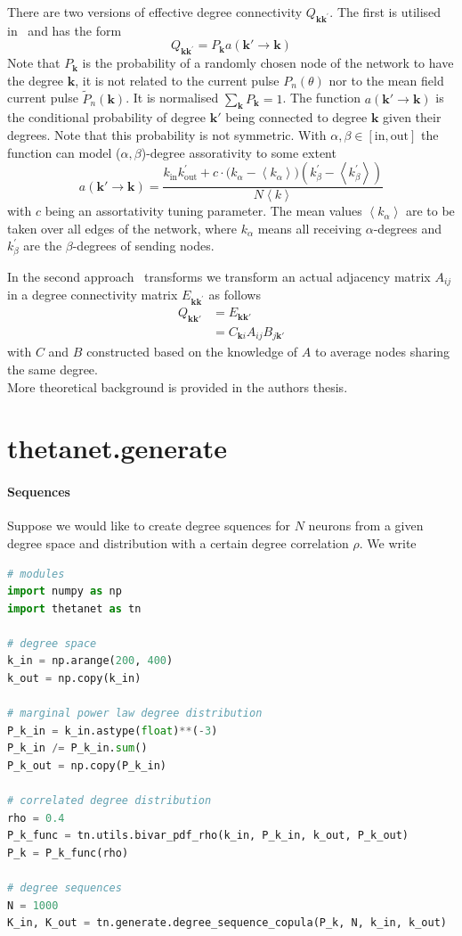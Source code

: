 \documentclass[bibliography=totoc, twoside]{article}
\numberwithin{equation}{section}
\newcommand{\inn}{\text{in}}
\newcommand{\out}{\text{out}}
\newcommand{\bk}{{\bm k}}
\newcommand{\be}{\begin{equation}}
\newcommand{\ee}{\end{equation}}
\begin{document}
There are two versions of effective degree connectivity $Q_{\bk \bk^\prime}$.
The first is utilised in~\cite{chandra2017modeling, laing2019} and has the form
\be
Q_{\bk \bk^\prime} = P_\bk a(\bk'\rightarrow \bk)
\ee
Note that $P_\bk$ is the probability of a randomly chosen node of the network to have the degree $\bk$, it is not related to the current pulse $P_n(\theta)$ nor to the mean field current pulse $\tilde{P}_n(\bk)$.
It is normalised $\sum_\bk P_\bk = 1$.
The function $a(\bk'\rightarrow \bk)$ is the conditional probability of degree $\bk'$ being connected to degree $\bk$ given their degrees. Note that this probability is not symmetric. With $\alpha, \beta \in [\inn, \out]$ the function can model ($\alpha,\beta$)-degree assorativity to some extent
\be
a(\bk'\rightarrow \bk) = \frac{k_{\inn} k_{\out}^\prime + c\cdot \Big(k_{\alpha} - \left<k_\alpha \right> \Big)\left(k_{\beta}^\prime - \left<k_\beta^\prime \right> \right)   }{N \left<k\right>}
\ee
with $c$ being an assortativity tuning parameter.
The mean values $\left<k_\alpha \right>$ are to be taken over all edges of the network, where $k_\alpha$ means all receiving $\alpha$-degrees and $k^\prime_\beta$ are the $\beta$-degrees of sending nodes.

In the second approach~\cite{blasche2019} transforms we transform an actual adjacency matrix $A_{ij}$ in a degree connectivity matrix $E_{\bk \bk^\prime}$ as follows
\begin{align}
    Q_{\bk \bk'} &= E_{\bk \bk'} \\
    &= C_{\bk i} A_{ij} B_{j \bk'}
\end{align}
with $C$ and $B$ constructed based on the knowledge of $A$ to average nodes sharing the same degree.
\\
More theoretical background is provided in the authors thesis.


\section{thetanet.generate}
\paragraph*{Sequences}
Suppose we would like to create degree squences for $N$ neurons from a given degree space and distribution with a certain degree correlation $\rho$.
We write
\begin{lstlisting}[language=python]
# modules
import numpy as np
import thetanet as tn

# degree space
k_in = np.arange(200, 400)
k_out = np.copy(k_in)

# marginal power law degree distribution
P_k_in = k_in.astype(float)**(-3)
P_k_in /= P_k_in.sum()
P_k_out = np.copy(P_k_in)

# correlated degree distribution
rho = 0.4
P_k_func = tn.utils.bivar_pdf_rho(k_in, P_k_in, k_out, P_k_out)
P_k = P_k_func(rho)

# degree sequences
N = 1000
K_in, K_out = tn.generate.degree_sequence_copula(P_k, N, k_in, k_out)
\end{lstlisting}
\end{document}
